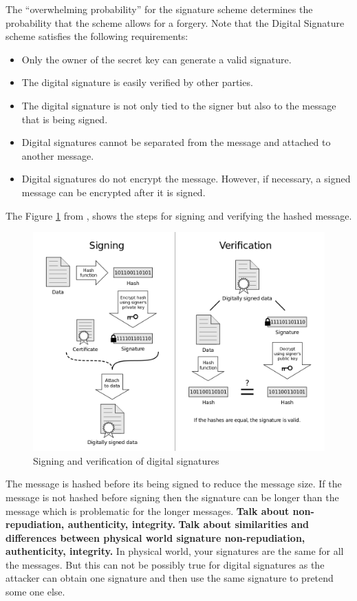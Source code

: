 	The ``overwhelming probability'' for the signature scheme determines the probability that the scheme allows for a forgery.
	Note that the Digital Signature scheme satisfies the following requirements:
		\begin{itemize}
			\item Only the owner of the secret key can generate a valid signature.
			\item The digital signature is easily verified by other parties.
			\item The digital signature is not only tied to the signer but also to the message that is being signed.
			\item Digital signatures cannot be separated from the message and attached to another message.
			\item Digital signatures do not encrypt the message. However, if necessary, a signed message can be encrypted after it is signed.
		\end{itemize}
	The Figure \ref{fig:digita-signature} from \cite{DigitalSignature}, shows the steps for signing and verifying the hashed message. 
	\begin{figure}[h!]
		\centering
		\includegraphics[scale = 0.4]{images/Digital_Signature_diagram.png}
		\caption{ Signing and verification of digital signatures}
		\label{fig:digita-signature}
	\end{figure}
	The message is hashed before its being signed to reduce the message size. 
	If the message is not hashed before signing then the signature can be longer than the message which is problematic for the longer messages.
	\textbf{Talk about non-repudiation, authenticity, integrity.}
	\textbf{Talk about similarities and differences between physical world signature non-repudiation, authenticity, integrity.}
	In physical world, your signatures are the same for all the messages. 
	But this can not be possibly true for digital signatures as the attacker can obtain one signature and then use the same signature to pretend some one else.


